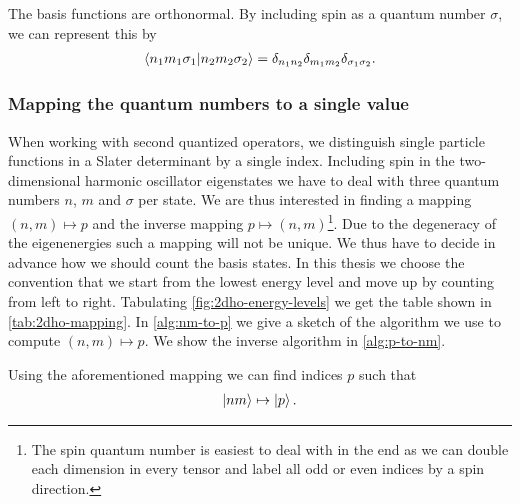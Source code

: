         The basis functions are orthonormal. By including spin as a quantum
        number $\sigma$, we can represent this by
        \begin{align}
            \braket{n_1 m_1 \sigma_1}{n_2 m_2 \sigma_2}
            = \delta_{n_1 n_2}\delta_{m_1 m_2} \delta_{\sigma_1 \sigma_2}.
        \end{align}

        \subsubsection{Mapping the quantum numbers to a single value}
            When working with second quantized operators, we distinguish single
            particle functions in a Slater determinant by a single index.
            Including spin in the two-dimensional harmonic oscillator
            eigenstates we have to deal with three quantum numbers $n$, $m$ and
            $\sigma$ per state.  We are thus interested in finding a mapping
            $(n, m) \mapsto p$ and the inverse mapping $p \mapsto (n,
            m)$\footnote{The spin quantum number is easiest to deal with in the
            end as we can double each dimension in every tensor and label all
            odd or even indices by a spin direction.}.  Due to the degeneracy of
            the eigenenergies such a mapping will not be unique. We thus have to
            decide in advance how we should count the basis states. In this
            thesis we choose the convention that we start from the lowest energy
            level and move up by counting from left to right. Tabulating
            \autoref{fig:2dho-energy-levels} we get the table shown in
            \autoref{tab:2dho-mapping}.  In \autoref{alg:nm-to-p} we give a
            sketch of the algorithm we use to compute $(n, m) \mapsto p$. We
            show the inverse algorithm in \autoref{alg:p-to-nm}.

            Using the aforementioned mapping we can find indices $p$ such that
            \begin{align}
                \ket{nm} \mapsto \ket{p}.
            \end{align}

